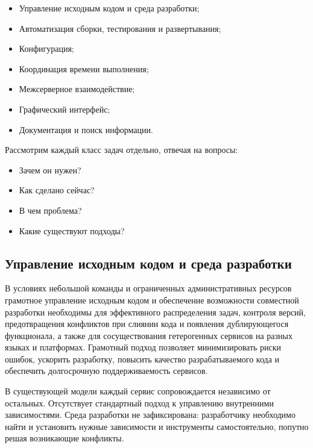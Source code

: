 \documentclass[../thesis.tex]{subfiles}
\begin{document}
	\begin{itemize}
		\item Управление исходным кодом и среда разработки;

		\item Автоматизация сборки, тестирования и развертывания;

		\item Конфигурация;

		\item Координация времени выполнения;

		\item Межсерверное взаимодействие;

		\item Графический интерфейс;

		\item Документация и поиск информации.
	\end{itemize}

	\noindent
	Рассмотрим каждый класс задач отдельно, отвечая на вопросы:

	\begin{itemize}
		\item Зачем он нужен?

		\item Как сделано сейчас?

		\item В чем проблема?

		\item Какие существуют подходы?
	\end{itemize}

	\subsection{Управление исходным кодом и среда разработки}

	В условиях небольшой команды и ограниченных административных ресурсов грамотное управление
	исходным кодом и обеспечение возможности совместной разработки необходимы для эффективного
	распределения задач, контроля версий, предотвращения конфликтов при слиянии кода и появления
	дублирующегося функционала, а также для сосуществования гетерогенных сервисов на разных языках и платформах.
	Грамотный подход позволяет минимизировать риски ошибок, ускорить разработку, повысить качество
	разрабатываемого кода и обеспечить долгосрочную поддерживаемость сервисов.

	В существующей модели каждый сервис сопровождается независимо от остальных. Отсутствует стандартный
	подход к управлению внутренними зависимостями. Среда разработки не зафиксирована: разработчику необходимо
	найти и установить нужные зависимости и инструменты самостоятельно, попутно решая возникающие
	конфликты.
\end{document}
